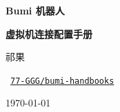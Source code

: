 \documentclass[UTF8,a4paper,zihao=-4,openany,oneside,fontset=fandol]{ctexbook}
\begin{document}
\begin{titlepage}
\centering
\vspace*{0.16\textheight}
{\Huge\bfseries Bumi 机器人\par}
\vspace{0.55cm}
{\huge\bfseries 虚拟机连接配置手册\par}
\vspace{1.0cm}
{\large 祁果\par}
\vspace{0.35cm}
{\small\faGithub\ \href{https://github.com/77-GGG/bumi-handbooks}{\texttt{77-GGG/bumi-handbooks}}\par}
\vspace{0.5cm}
{\small\today\par}
\vfill
\end{titlepage}

\frontmatter

\clearpage
{}
\tableofcontents

\mainmatter
{}







\appendix


\end{document}
